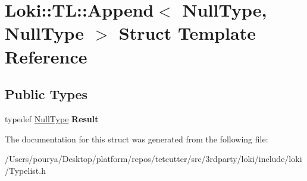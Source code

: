 \hypertarget{structLoki_1_1TL_1_1Append_3_01NullType_00_01NullType_01_4}{}\section{Loki\+:\+:T\+L\+:\+:Append$<$ Null\+Type, Null\+Type $>$ Struct Template Reference}
\label{structLoki_1_1TL_1_1Append_3_01NullType_00_01NullType_01_4}
\subsection*{Public Types}
\begin{DoxyCompactItemize}
\item 
\hypertarget{structLoki_1_1TL_1_1Append_3_01NullType_00_01NullType_01_4_a7c8eaae1a3463942bbb0448e03248259}{}typedef \hyperlink{classLoki_1_1NullType}{Null\+Type} {\bfseries Result}\label{structLoki_1_1TL_1_1Append_3_01NullType_00_01NullType_01_4_a7c8eaae1a3463942bbb0448e03248259}

\end{DoxyCompactItemize}


The documentation for this struct was generated from the following file\+:\begin{DoxyCompactItemize}
\item 
/\+Users/pourya/\+Desktop/platform/repos/tetcutter/src/3rdparty/loki/include/loki/Typelist.\+h\end{DoxyCompactItemize}

